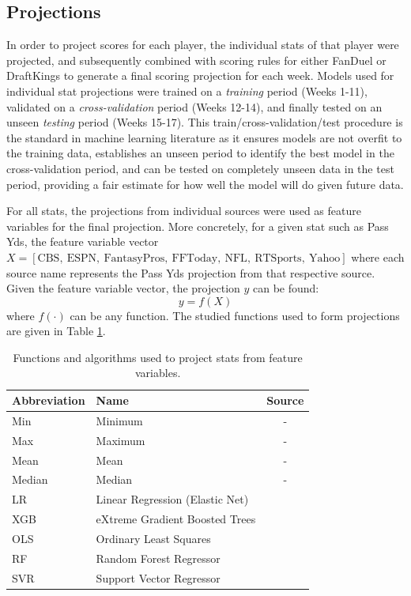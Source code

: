 \documentclass[12pt]{article}
\begin{document}
\subsection{Projections}
In order to project scores for each player, the individual stats of that player were projected, and subsequently combined with scoring rules for either FanDuel or DraftKings to generate a final scoring projection for each week. Models used for individual stat projections were trained on a \textit{training} period (Weeks 1-11), validated on a \textit{cross-validation} period (Weeks 12-14), and finally tested on an unseen \textit{testing} period (Weeks 15-17). This train/cross-validation/test procedure is the standard in machine learning literature as it ensures models are not overfit to the training data, establishes an unseen period to identify the best model in the cross-validation period, and can be tested on completely unseen data in the test period, providing a fair estimate for how well the model will do given future data.\bigskip

For all stats, the projections from individual sources were used as feature variables for the final projection. More concretely, for a given stat such as Pass Yds, the feature variable vector $X = [\text{CBS},\ \text{ESPN},\ \text{FantasyPros},\ \text{FFToday},\ \text{NFL},\ \text{RTSports},\ \text{Yahoo}]$ where each source name represents the Pass Yds projection from that respective source. Given the feature variable vector, the projection $y$ can be found:
\begin{equation}
y = f(X)
\end{equation}
where $f(\cdot)$ can be any function. The studied functions used to form projections are given in Table \ref{ML algos}.

\begin{table}[H]
\caption{Functions and algorithms used to project stats from feature variables.}
\label{ML algos}
\centering
\begin{tabular}{llc}
	\toprule
	Abbreviation        &  Name           &  Source \\
	\midrule
	Min		& Minimum		& -\\
	Max		& Maximum		& -\\
	Mean		& Mean		& -\\
	Median		& Median		& -\\
	LR  & Linear Regression (Elastic Net)  & \cite{LR paper, LR algo}\\
	XGB & eXtreme Gradient Boosted Trees  & \cite{XGB paper, XGB algo}\\
	OLS & Ordinary Least Squares  & \cite{OLS algo}\\
	RF & Random Forest Regressor & \cite{RF paper, RF algo}\\
	SVR & Support Vector Regressor  & \cite{SVR paper, SVR algo}\\
	\bottomrule
\end{tabular}
\end{table}
\end{document}
